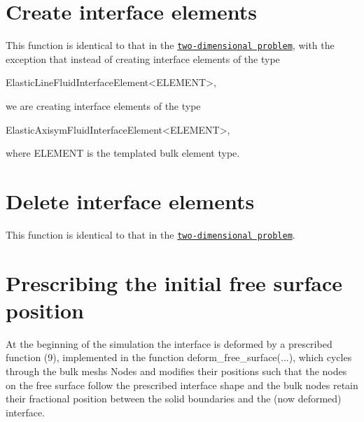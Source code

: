  

\hypertarget{index_create_interface_elements}{}\section{Create interface elements}\label{index_create_interface_elements}
This function is identical to that in the \href{../../../navier_stokes/two_layer_interface/html/index.html#create_interface_elements}{\tt two-\/dimensional problem}, with the exception that instead of creating interface elements of the type


\begin{DoxyCode}
ElasticLineFluidInterfaceElement<ELEMENT>,
\end{DoxyCode}


we are creating interface elements of the type


\begin{DoxyCode}
ElasticAxisymFluidInterfaceElement<ELEMENT>,
\end{DoxyCode}


where {\ttfamily E\+L\+E\+M\+E\+NT} is the templated bulk element type.



 

\hypertarget{index_delete_interface_elements}{}\section{Delete interface elements}\label{index_delete_interface_elements}
This function is identical to that in the \href{../../../navier_stokes/two_layer_interface/html/index.html#delete_interface_elements}{\tt two-\/dimensional problem}.



 

\hypertarget{index_deform_free_surface}{}\section{Prescribing the initial free surface position}\label{index_deform_free_surface}
At the beginning of the simulation the interface is deformed by a prescribed function (9), implemented in the function {\ttfamily deform\+\_\+free\+\_\+surface}(...), which cycles through the bulk mesh\textquotesingle{}s {\ttfamily Nodes} and modifies their positions such that the nodes on the free surface follow the prescribed interface shape and the bulk nodes retain their fractional position between the solid boundaries and the (now deformed) interface.


